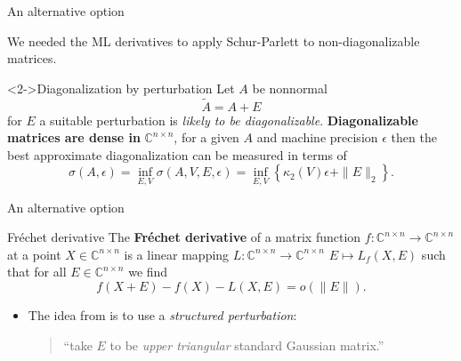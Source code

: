 \documentclass[aspectratio=169,xcolor=dvipsnames]{beamer}
\begin{document}
\begin{frame}{\faHammer\;An alternative option \parencite{HighamML}}

We needed the ML derivatives to apply Schur-Parlett to non-diagonalizable matrices.

\begin{block}<2->{Diagonalization by perturbation}
Let $A$ be nonnormal
\[
\tilde{A} = A + E
\]
for $E$ a suitable perturbation is \emph{likely to be diagonalizable}. \textbf{Diagonalizable matrices are dense in }$\mathbb{C}^{n \times n}$, for a given $A$ and machine precision $\epsilon$ then the best approximate diagonalization can be measured in terms of
\[
\sigma(A,\epsilon) = \inf_{E,V} \sigma(A,V,E,\epsilon) = \inf_{E,V} \left\lbrace \kappa_2(V)\epsilon + \|E\|_2 \right\rbrace.
\]
\end{block}

\end{frame}

\begin{frame}{\faHammer\;An alternative option \parencite{HighamML}}

\begin{block}{Fréchet derivative}
The \textbf{Fréchet derivative} of a matrix function $f: \mathbb{C}^{n \times n} \rightarrow \mathbb{C}^{n \times n}$ at a point $X \in \mathbb{C}^{n \times n}$ is a linear mapping $L : \mathbb{C}^{n \times n} \rightarrow \mathbb{C}^{n \times n}$ $E \mapsto L_f(X,E)$ such that for all $E \in \mathbb{C}^{n \times n}$ we find
\[
f(X+E) - f(X) -L(X,E) = o(\|E\|).
\]
\end{block}
\begin{itemize}
	\item[\faLightbulb]<3-> The idea from \parencite{HighamML} is to use a \emph{structured perturbation}:
	\begin{quote}
		``take $E$ to be \emph{upper triangular} standard Gaussian matrix.''
	\end{quote}
\end{itemize}
\end{frame}
\end{document}
